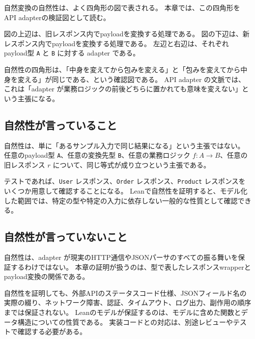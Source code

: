 自然変換の自然性は、よく四角形の図で表される。
本章では、この四角形をAPI adapterの検証図として読む。


図の上辺は、旧レスポンス内でpayloadを変換する処理である。
図の下辺は、新レスポンス内でpayloadを変換する処理である。
左辺と右辺は、それぞれpayload型 \texttt{A} と \texttt{B} に対する adapter である。

\begin{intuitionbox}
自然性の四角形は、「中身を変えてから包みを変える」と「包みを変えてから中身を変える」が同じである、という確認図である。
API adapter の文脈では、これは「adapter が業務ロジックの前後どちらに置かれても意味を変えない」という主張になる。
\end{intuitionbox}

\subsection{自然性が言っていること}

自然性は、単に「あるサンプル入力で同じ結果になる」という主張ではない。
任意のpayload型 \texttt{A}、任意の変換先型 \texttt{B}、任意の業務ロジック \(f : A \to B\)、任意の旧レスポンス \(r\) について、同じ等式が成り立つという主張である。

\begin{softwarebox}
テストであれば、\texttt{User} レスポンス、\texttt{Order} レスポンス、\texttt{Product} レスポンスをいくつか用意して確認することになる。
Leanで自然性を証明すると、モデル化した範囲では、特定の型や特定の入力に依存しない一般的な性質として確認できる。
\end{softwarebox}

\subsection{自然性が言っていないこと}

自然性は、adapter が現実のHTTP通信やJSONパーサのすべての振る舞いを保証するわけではない。
本章の証明が扱うのは、型で表したレスポンスwrapperとpayload変換の関係である。

\begin{warningbox}
自然性を証明しても、外部APIのステータスコード仕様、JSONフィールド名の実際の綴り、ネットワーク障害、認証、タイムアウト、ログ出力、副作用の順序までは保証されない。
Leanのモデルが保証するのは、モデルに含めた関数とデータ構造についての性質である。
実装コードとの対応は、別途レビューやテストで確認する必要がある。
\end{warningbox}

